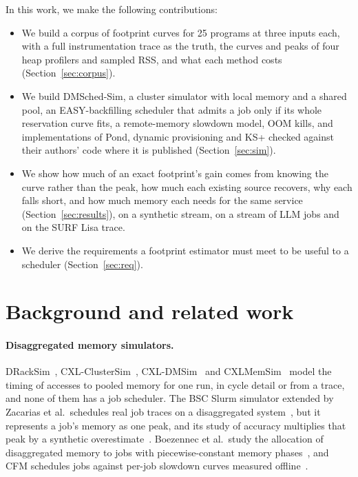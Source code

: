 \documentclass[11pt]{article}
\newcommand{\secref}[1]{Section~\ref{#1}}
\begin{document}
In this work, we make the following contributions:
\begin{itemize}
  \item We build a corpus of footprint curves for 25 programs at three inputs each, with a full instrumentation trace
    as the truth, the curves and peaks of four heap profilers and sampled RSS, and what each method costs
    (\secref{sec:corpus}).
  \item We build DMSched-Sim, a cluster simulator with local memory and a shared pool, an EASY-backfilling scheduler
    that admits a job only if its whole reservation curve fits, a remote-memory slowdown model, OOM kills, and
    implementations of Pond, dynamic provisioning and KS+ checked against their authors' code where it is published
    (\secref{sec:sim}).
  \item We show how much of an exact footprint's gain comes from knowing the curve rather than the peak, how much each
    existing source recovers, why each falls short, and how much memory each needs for the same service
    (\secref{sec:results}), on a synthetic stream, on a stream of LLM jobs and on the SURF Lisa trace.
  \item We derive the requirements a footprint estimator must meet to be useful to a scheduler (\secref{sec:req}).
\end{itemize}

\section{Background and related work}
\label{sec:related}

\paragraph{Disaggregated memory simulators.} DRackSim~\cite{Puri2024DRackSim}, CXL-ClusterSim~\cite{CXLClusterSim},
CXL-DMSim~\cite{CXLDMSim} and CXLMemSim~\cite{Yang2023CXLMemSim} model the timing of accesses to pooled memory for one
run, in cycle detail or from a trace, and none of them has a job scheduler. The BSC Slurm simulator extended by Zacarias
et al.\ schedules real job traces on a disaggregated system~\cite{Zacarias2021Throughput}, but it represents a job's
memory as one peak, and its study of accuracy multiplies that peak by a synthetic overestimate~\cite{Zacarias2021Accurate}.
Boezennec et al.\ study the allocation of disaggregated memory to jobs with piecewise-constant memory
phases~\cite{Boezennec2024}, and CFM schedules jobs against per-job slowdown curves measured offline~\cite{Amaro2020CFM}.
\end{document}
